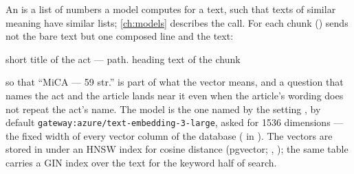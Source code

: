 An  is a list of numbers a model computes for a text, such that texts of
similar meaning have similar lists; \cref{ch:models} describes the call. For each chunk
 () sends not the bare text but one composed line
and the text:

\begin{codeblock}
{short title of the act} — {path}. {heading}
{text of the chunk}
\end{codeblock}

so that \enquote{MiCA — 59 str.} is part of what the vector means, and a question that names
the act and the article lands near it even when the article's wording does not repeat the
act's name. The model is the one named by the setting , by default
\texttt{gateway:azure/text-embedding-3-large}, asked for 1536 dimensions --- the fixed width of
every vector column of the database ( in ). The
vectors are stored in  under an HNSW index for cosine distance
(pgvector; , ); the same table carries a GIN index
over the text for the keyword half of search.

